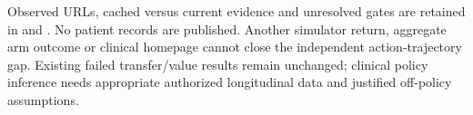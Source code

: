 Observed URLs, cached versus current evidence and unresolved gates are retained in  and . No patient records are published. Another simulator return, aggregate arm outcome or clinical homepage cannot close the independent action-trajectory gap. Existing failed transfer/value results remain unchanged; clinical policy inference needs appropriate authorized longitudinal data and justified off-policy assumptions.




